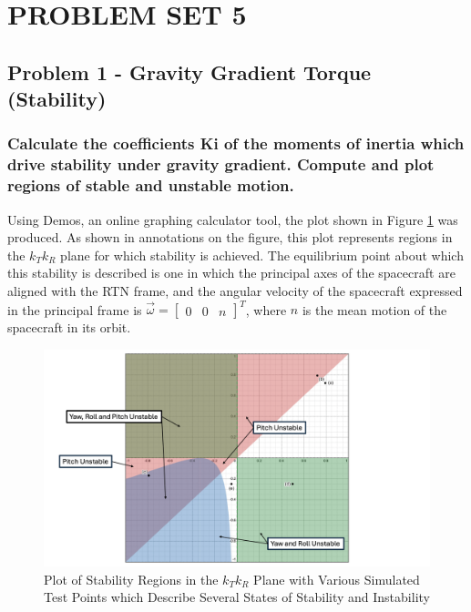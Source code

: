 \section{\Large PROBLEM SET 5}

\subsection{Problem 1 - Gravity Gradient Torque (Stability)}

\subsubsection{Calculate the coefficients Ki of the moments of inertia which drive stability under gravity gradient. Compute and plot regions of stable and unstable motion.}

Using Demos, an online graphing calculator tool, the plot shown in Figure \ref{fig:grav_gradient_stability} was produced. As shown in annotations on the figure, this plot represents regions in the $k_Tk_R$ plane for which stability is achieved. The equilibrium point about which this stability is described is one in which the principal axes of the spacecraft are aligned with the RTN frame, and the angular velocity of the spacecraft expressed in the principal frame is $\vec{\omega} = \begin{bmatrix} 0 & 0 & n \end{bmatrix}^T$, where $n$ is the mean motion of the spacecraft in its orbit. 

\begin{figure}[H]
    \centering
    \captionsetup{ justification = centering}
    \includegraphics[width = 15cm]{Images/PS5/gravityGradientStabilityPlot.png}
    \caption{Plot of Stability Regions in the $k_Tk_R$ Plane with Various Simulated Test Points which Describe Several States of Stability and Instability}
    \label{fig:grav_gradient_stability}
\end{figure}

